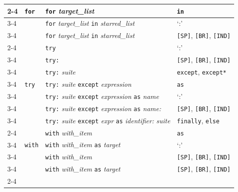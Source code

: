\begin{table}[!t]
\begin{tabular}{m{2.8cm}m{2cm}m{6.5cm}m{5cm}}
        \cmidrule{2-4}
        & \multirow{3}{*}{\texttt{for}}   & \texttt{for} \textit{target\_list}  & \texttt{in}\\
        \cmidrule{3-4}
        & & \texttt{for} \textit{target\_list} \texttt{in} \textit{starred\_list}  & `:' \\
        \cmidrule{3-4}
        & & \texttt{for} \textit{target\_list} \texttt{in} \textit{starred\_list}\text{:} & \texttt{[SP]}, \texttt{[BR]}, \texttt{[IND]}  \\
        \cmidrule{2-4}
        & \multirow{7}{*}{\texttt{try}} &  \texttt{try} &  `:' \\
        \cmidrule{3-4}
        & & \texttt{try:} & \texttt{[SP]},  \texttt{[BR]}, \texttt{[IND]} \\
        \cmidrule{3-4}
        & & \texttt{try:} \textit{suite} & \texttt{except}, \texttt{except*} \\
        \cmidrule{3-4}
        & & \texttt{try:} \textit{suite} \texttt{except} \textit{expression}  &  \texttt{as} \\
        \cmidrule{3-4}
        & & \texttt{try:} \textit{suite} \texttt{except} \textit{expression} \texttt{as} \textit{name} & `:' \\
         \cmidrule{3-4}
         & & \texttt{try:} \textit{suite} \texttt{except} \textit{expression} \texttt{as} \textit{name:} & \texttt{[SP]},  \texttt{[BR]}, \texttt{[IND]}\\
         \cmidrule{3-4}

        & & \texttt{try:} \textit{suite} \texttt{except} \textit{expr} \texttt{as} \textit{identifier:} \textit{suite} & \texttt{finally}, \texttt{else} \\
        \cmidrule{2-4}
        & \multirow{3}{*}{\texttt{with}} & \texttt{with} \textit{with\_item} & \texttt{as} \\
        \cmidrule{3-4}
        & & \texttt{with} \textit{with\_item} \texttt{as} \textit{target} & `:' \\
        \cmidrule{3-4}

        & & \texttt{with} \textit{with\_item}\text{:} & \texttt{[SP]}, \texttt{[BR]}, \texttt{[IND]} \\
        \cmidrule{3-4}

        & & \texttt{with} \textit{with\_item} \texttt{as} \textit{target}\text{:} & \texttt{[SP]}, \texttt{[BR]}, \texttt{[IND]} \\
        \cmidrule{2-4}


\end{tabular}
\end{table}
